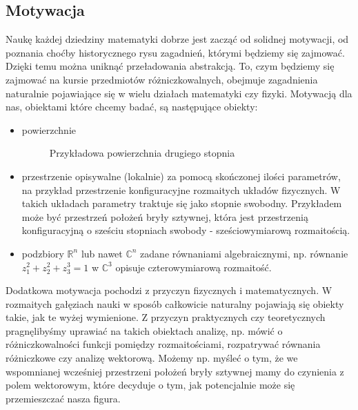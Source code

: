 \subsection{Motywacja}
Naukę każdej dziedziny matematyki dobrze jest zacząć od solidnej motywacji, od poznania choćby historycznego rysu zagadnień, którymi będziemy się zajmować. Dzięki temu można uniknąć przeładowania abstrakcją. To, czym będziemy się zajmować na kursie przedmiotów różniczkowalnych, obejmuje zagadnienia naturalnie pojawiające się w wielu działach matematyki czy fizyki. Motywacją dla nas, obiektami które chcemy badać, są następujące obiekty:
\begin{itemize}
	\item powierzchnie
		\begin{figure}[ht]
			    \centering
				\caption{Przykładowa powierzchnia drugiego stopnia}
				\label{fig:torus}
		\end{figure}
	\item przestrzenie opisywalne (lokalnie) za pomocą skończonej ilości parametrów, na przykład przestrzenie konfiguracyjne rozmaitych układów fizycznych. W takich układach parametry traktuje się jako stopnie swobodny. Przykładem może być przestrzeń położeń bryły sztywnej, która jest przestrzenią konfiguracyjną o sześciu stopniach swobody - sześciowymiarową rozmaitością.

	\item podzbiory $\mathbb{R}^n$ lub nawet $\mathbb{C}^n$ zadane równaniami algebraicznymi, np. równanie $z_1^2 + z_2^2 + z_3^3 = 1$ w $\mathbb{C}^3$ opisuje czterowymiarową rozmaitość.
\end{itemize}
Dodatkowa motywacja pochodzi z przyczyn fizycznych i matematycznych. W rozmaitych gałęziach nauki w sposób całkowicie naturalny pojawiają się obiekty takie, jak te wyżej wymienione. Z przyczyn praktycznych czy teoretycznych pragnęlibyśmy uprawiać na takich obiektach analizę, np. mówić o różniczkowalności funkcji pomiędzy rozmaitościami, rozpatrywać równania różniczkowe czy analizę wektorową. Możemy np. myśleć o tym, że we wspomnianej wcześniej przestrzeni położeń bryły sztywnej mamy do czynienia z polem wektorowym, które decyduje o tym, jak potencjalnie może się przemieszczać nasza figura.

